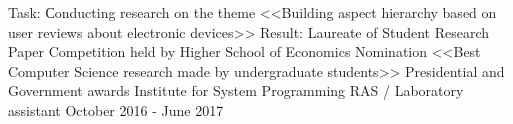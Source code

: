 \begin{cventries}

\cventry
{Task: Сonducting research on the theme <<Building aspect hierarchy based on user reviews about electronic devices>>
		\newline Result: Laureate of Student Research Paper Competition held by Higher School of Economics
		\newline Nomination <<Best Computer Science research made by undergraduate students>>
		\newline Presidential and Government awards
		\newline
	} %
{Institute for System Programming RAS / Laboratory assistant} %
{} %
{October 2016 - June 2017} %
\noindent	



\end{cventries}